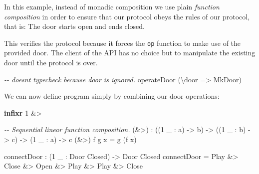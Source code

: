 \documentclass[
]{article}
\newenvironment{Shaded}{}{}
\newcommand{\CommentTok}[1]{\textcolor[rgb]{0.38,0.63,0.69}{\textit{#1}}}
\newcommand{\DataTypeTok}[1]{\textcolor[rgb]{0.56,0.13,0.00}{#1}}
\newcommand{\DecValTok}[1]{\textcolor[rgb]{0.25,0.63,0.44}{#1}}
\newcommand{\KeywordTok}[1]{\textcolor[rgb]{0.00,0.44,0.13}{\textbf{#1}}}
\newcommand{\NormalTok}[1]{#1}
\newcommand{\OperatorTok}[1]{\textcolor[rgb]{0.40,0.40,0.40}{#1}}
\newcommand{\OtherTok}[1]{\textcolor[rgb]{0.00,0.44,0.13}{#1}}
\begin{document}
In this example, instead of monadic composition we use plain
\emph{function composition} in order to ensure that our protocol obeys
the rules of our protocol, that is: The door starts open and ends
closed.

This verifies the protocol because it forces the \texttt{op} function to
make use of the provided door. The client of the API has no choice but
to manipulate the existing door until the protocol is over.

\begin{Shaded}
\begin{Highlighting}[]
\CommentTok{{-}{-} doesn\textquotesingle{}t typecheck because door is ignored.}
\NormalTok{operateDoor (\textbackslash{}door }\OtherTok{=\textgreater{}} \DataTypeTok{MkDoor}\NormalTok{) }
\end{Highlighting}
\end{Shaded}

We can now define program simply by combining our door operations:

\begin{Shaded}
\begin{Highlighting}[]
\KeywordTok{infixr} \DecValTok{1} \OperatorTok{\&\textgreater{}}

\CommentTok{{-}{-} Sequential linear function composition.}
\NormalTok{(}\OperatorTok{\&\textgreater{}}\NormalTok{) }\OperatorTok{:}\NormalTok{ ((}\DecValTok{1}\NormalTok{ \_ }\OperatorTok{:}\NormalTok{ a) }\OtherTok{{-}\textgreater{}}\NormalTok{ b) }\OtherTok{{-}\textgreater{}} 
\NormalTok{       ((}\DecValTok{1}\NormalTok{ \_ }\OperatorTok{:}\NormalTok{ b) }\OtherTok{{-}\textgreater{}}\NormalTok{ c) }\OtherTok{{-}\textgreater{}} 
\NormalTok{        (}\DecValTok{1}\NormalTok{ \_ }\OperatorTok{:}\NormalTok{ a) }\OtherTok{{-}\textgreater{}}\NormalTok{ c}
\NormalTok{(}\OperatorTok{\&\textgreater{}}\NormalTok{) f g x }\OtherTok{=}\NormalTok{ g (f x)}

\NormalTok{connectDoor }\OperatorTok{:}\NormalTok{ (}\DecValTok{1}\NormalTok{ \_ }\OperatorTok{:} \DataTypeTok{Door} \DataTypeTok{Closed}\NormalTok{) }\OtherTok{{-}\textgreater{}} \DataTypeTok{Door} \DataTypeTok{Closed}
\NormalTok{connectDoor }\OtherTok{=} \DataTypeTok{Play} \OperatorTok{\&\textgreater{}} \DataTypeTok{Close} \OperatorTok{\&\textgreater{}} \DataTypeTok{Open} \OperatorTok{\&\textgreater{}} \DataTypeTok{Play} \OperatorTok{\&\textgreater{}} \DataTypeTok{Play} \OperatorTok{\&\textgreater{}} \DataTypeTok{Close}
\end{Highlighting}
\end{Shaded}
\end{document}
